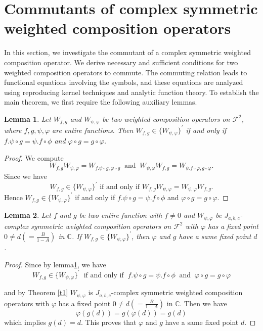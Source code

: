 \documentclass[reqno]{amsart}
\newtheorem{lemma}{Lemma}
\theoremstyle{remark}
\theoremstyle{Definition}
\theoremstyle{remark}
\numberwithin{equation}{section}
\begin{document}
\section{Commutants of complex symmetric weighted composition operators}\label{sec:prelimi}
In this section, we investigate the commutant of a complex symmetric weighted composition operator. We derive necessary and sufficient conditions for two weighted composition operators to commute. The commuting relation leads to functional equations involving the symbols, and these equations are analyzed using reproducing kernel techniques and analytic function theory. To establish the main theorem, we first require the following auxiliary lemmas.
\begin{lemma}\label{1l}
    Let $W_{f,g}$ and  $W_{\psi, \varphi}$ be two weighted composition operators on $\mathcal{F}^{2}$, where $f, g, \psi, \varphi$ are entire functions. Then $W_{f,g}\in \{W_{\psi, \varphi}\}^{'}$ if and only if $f.\psi \circ g =\psi .f\circ \phi$ and $\varphi \circ g = g \circ \varphi$.
\end{lemma}
\begin{proof}
    We compute
    $$W_{f,g}W_{\psi, \varphi}= W_{f.\psi \circ g , \varphi \circ g} ~\text{ and }~ W_{\psi, \varphi}W_{f,g}= W_{\psi. f\circ \varphi , g\circ \varphi}. $$ Since we have
    $$W_{f,g}\in \{W_{\psi, \varphi}\}^{'} \text{ if and only if } W_{f,g}W_{\psi, \varphi}= W_{\psi, \varphi}W_{f,g}.$$
    Hence $W_{f,g}\in \{W_{\psi, \varphi}\}^{'}$
    if and only if $f.\psi \circ g =\psi .f\circ \phi$ and $\varphi \circ g = g \circ \varphi$.
\end{proof}
\begin{lemma}\label{l2} 
Let $f$ and $g$ be two entire function with $f\neq 0$ and $W_{\psi, \varphi}$ be $J_{a,b,c}$-complex symmetric weighted  composition operators on $\mathcal{F}^{2}$ with $\varphi$ has a fixed point 
$0\neq d(=\frac{B}{1-A})$ in $\mathbb{C}$. If $W_{f,g} \in \{W_{\psi, \varphi}\}^{'}$, then  $\varphi$ and $g$ have a same fixed point $d$.
\end{lemma}
\begin{proof}
   Since by lemma\ref{1l}, we have 
   $$W_{f,g} \in \{W_{\psi, \varphi}\}^{'} ~\text{ if and only if }~ f.\psi \circ g =\psi .f\circ \phi ~\text{ and }~ \varphi \circ g = g \circ \varphi $$


   and by Theorem \ref{t1} $W_{\psi, \varphi}$ is $J_{a,b,c}$-complex symmetric weighted  composition operators with $\varphi$ has a fixed point 
$0\neq d(=\frac{B}{1-A})$ in $\mathbb{C}$. Then we have 
$$\varphi(g(d)) = g (\varphi(d))= g(d)$$
which implies $g(d)=d$. This proves that $\varphi$ and $g$ have a same fixed point $d$.
\end{proof}
\end{document}
